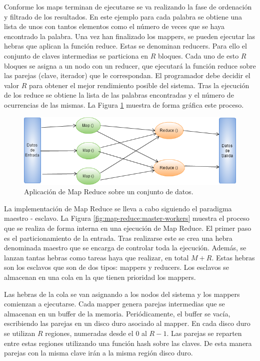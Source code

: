 \documentclass[10pt]{article}
\begin{document}
		Conforme los maps terminan de ejecutarse se va realizando la fase de ordenación y filtrado de los resultados. En este ejemplo para cada palabra se obtiene una lista de unos con tantos elementos como el número de veces que se haya encontrado la palabra. Una vez han finalizado los mappers, se pueden ejecutar las hebras que aplican la función reduce. Estas se denominan reducers. Para ello el conjunto de claves intermedias se particiona en $R$ bloques. Cada uno de esto $R$ bloques se asigna a un nodo con un reducer, que ejecutará la función reduce sobre las parejas (clave, iterador) que le correspondan. El programador debe decidir el valor $R$ para obtener el mejor rendimiento posible del sistema. Tras la ejecución de los reduce se obtiene la lista de las palabras encontradas y el número de ocurrencias de las mismas.  La Figura \ref{fig:map-reduce} muestra de forma gráfica este proceso.

		\begin{figure}[H]
			\centering
			\includegraphics[width=14cm]{./images/MapReduce.png}
			\caption{Aplicación de Map Reduce sobre un conjunto de datos.} 
			\label{fig:map-reduce}
		\end{figure}


		La implementación de Map Reduce se lleva a cabo siguiendo el paradigma maestro - esclavo. La Figura \ref{fig:map-reduce:master-workers} muestra el proceso que se realiza de forma interna en una ejecución de Map Reduce. El primer paso es el particionamiento de la entrada. Tras realizarse este se crea una hebra denominada maestro que se encarga de controlar toda la ejecución. Además, se lanzan tantas hebras como tareas haya que realizar, en total $M+R$. Estas hebras son los esclavos que son de dos tipos: mappers y reducers. Los esclavos se almacenan en una cola en la que tienen prioridad los mappers.
		
		Las hebras de la cola se van asignando a los nodos del sistema y los mappers comienzan a ejecutarse. Cada mapper genera parejas intermedias que se almacenan en un buffer de la memoria. Periódicamente, el buffer se vacía, escribiendo las parejas en un disco duro asociado al mapper. En cada disco duro se utilizan $R$ regiones, numeradas desde el $0$ al $R-1$. Las parejas se reparten entre estas regiones utilizando una función hash sobre las claves. De esta manera parejas con la misma clave irán a la misma región disco duro. 
\end{document}
